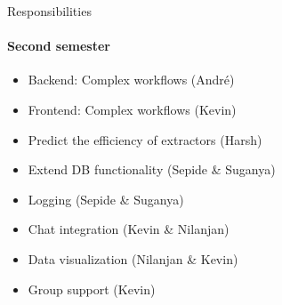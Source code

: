 \begin{frame}{Responsibilities}
\framesubtitle{Second semester}
	\begin{itemize}
		\item Backend: Complex workflows (André)
		\item Frontend: Complex workflows (Kevin)
		\item Predict the efficiency of extractors (Harsh)
		\item Extend DB functionality (Sepide \& Suganya)
		\item Logging (Sepide \& Suganya)
		\item Chat integration (Kevin \& Nilanjan)
		\item Data visualization (Nilanjan \& Kevin)
		\item Group support (Kevin)
	\end{itemize}
\end{frame}